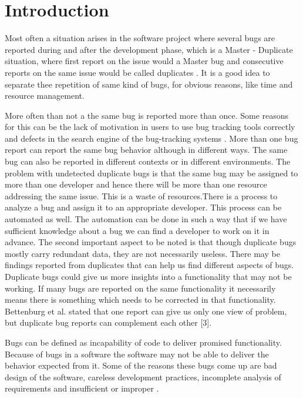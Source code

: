 \documentclass[]{sig-alternate-05-2015}
\begin{document}
\section{Introduction}

Most often a situation arises in the software project where several bugs are reported during and after the development phase, which is a Master - Duplicate situation, where first report on the issue would a Master bug and consecutive reports on the same issue would be called duplicates \cite{Sun2011}. It is a good idea to separate thee repetition of same kind of bugs, for obvious reasons, like time and resource management. \newline

More often than not a the same bug is reported more than once. Some reasons for this can be the lack of motivation in users to use bug tracking tools correctly and defects in the search engine of the bug-tracking systems \cite{Bettenburg}. More than one bug report can report the same bug behavior although in different ways. The same bug can also be reported in different contexts or in different environments. The problem with undetected duplicate bugs is that the same bug may be assigned to more than one developer and hence there will be more than one resource addressing the same issue. This is a waste of resources.There is a process to analyze a bug and assign it to an appropriate developer. This process can be automated as well. The automation can be done in such a way that if we have sufficient knowledge about a bug we can find a developer to work on it in advance. The second important aspect to be noted is that though duplicate bugs mostly carry redundant data, they are not necessarily useless. There may be findings reported from duplicates that can help us find different aspects of bugs. Duplicate bugs could give us more insights into a functionality that may not be working. If many bugs are reported on the same functionality it necessarily means there is something which needs to be corrected in that functionality. Bettenburg et al. stated that one report can give us only one view of problem, but duplicate bug reports can complement each other [3].\newline

Bugs can be defined as incapability of code to deliver promised functionality. Because of bugs in a software the software may not be able to deliver the behavior expected from it. Some of the reasons these bugs come up are bad design of the software, careless development practices, incomplete analysis of requirements and insufficient or improper \cite{Hangal2002}. \newline
\end{document}
